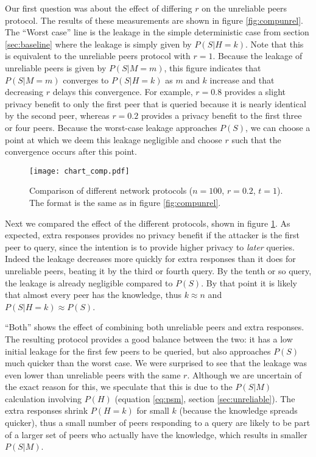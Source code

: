 \documentclass{article}
\newcommand{\eqnref}[1]{equation \eqref{eq:#1}}
\newcommand{\secref}[1]{section \ref{sec:#1}}
\newcommand{\figref}[1]{figure \ref{fig:#1}}
\begin{document}
Our first question was about the effect of differing $r$ on the unreliable peers
protocol. The results of these measurements are shown in \figref{compunrel}.
The ``Worst case'' line is the leakage in the simple deterministic case from
\secref{baseline} where the leakage is simply given by $P(S|H=k)$. Note that
this is equivalent to the unreliable peers protocol with $r=1$. Because the
leakage of unreliable peers is given by $P(S|M=m)$, this figure
indicates that $P(S|M=m)$ converges to $P(S|H=k)$ as $m$ and $k$ increase and
that decreasing $r$ delays this convergence. For example, $r=0.8$ provides a
slight privacy benefit to only the first peer that is queried because it is nearly identical
by the second peer, whereas $r=0.2$ provides a privacy benefit to the first
three or four peers. Because the worst-case leakage approaches $P(S)$, we can
choose a point at which we deem this leakage negligible and choose $r$ such that
the convergence occurs after this point.


\begin{figure}%
    \centering
	\texttt{[image: chart\_comp.pdf]}
	\caption{Comparison of different network protocols ($n=100$, $r=0.2$, $t=1$).
	The format is the same as in \figref{compunrel}.}
    \label{fig:comp}%
\end{figure}

Next we compared the effect of the different protocols, shown in \figref{comp}.
As expected, extra responses provides no privacy benefit if the attacker is the
first peer to query, since the intention is to provide higher privacy to {\it
later} queries. Indeed the leakage decreases more quickly for extra
responses than it does for unreliable peers, beating it by the third or fourth
query. By the tenth or so query, the leakage is already negligible compared to
$P(S)$. By that point it is likely that almost every peer has the knowledge,
thus $k\approx n$ and $P(S|H=k)\approx P(S)$.

``Both'' shows the effect of combining both unreliable peers and extra
responses. The resulting protocol provides a good balance between the two: it
has a low initial leakage for the first few peers to be queried, but also
approaches $P(S)$ much quicker than the worst case. We were surprised to see
that the leakage was even lower than unreliable peers with the same $r$.
Although we are uncertain of the exact reason for this, we speculate that this
is due to the $P(S|M)$ calculation involving $P(H)$ (\eqnref{psm},
\secref{unreliable}). The extra responses
shrink $P(H=k)$ for small $k$ (because the knowledge spreads quicker), thus a
small number of peers responding to a query are likely to be part of a larger
set of peers who actually have the knowledge, which results in smaller $P(S|M)$.
\end{document}
